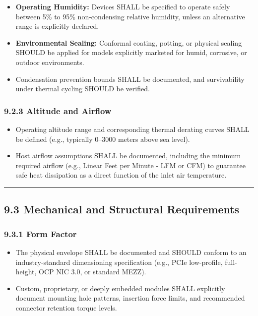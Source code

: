 \documentclass[
]{article}
\begin{document}
\begin{itemize}
\item
  \textbf{Operating Humidity:} Devices SHALL be specified to operate
  safely between 5\% to 95\% non-condensing relative humidity, unless an
  alternative range is explicitly declared.\\
\item
  \textbf{Environmental Sealing:} Conformal coating, potting, or
  physical sealing SHOULD be applied for models explicitly marketed for
  humid, corrosive, or outdoor environments.\\
\item
  Condensation prevention bounds SHALL be documented, and survivability
  under thermal cycling SHOULD be verified.
\end{itemize}

\subsubsection{9.2.3 Altitude and Airflow}\label{altitude-and-airflow}

\begin{itemize}
\item
  Operating altitude range and corresponding thermal derating curves
  SHALL be defined (e.g., typically 0--3000 meters above sea level).\\
\item
  Host airflow assumptions SHALL be documented, including the minimum
  required airflow (e.g., Linear Feet per Minute - LFM or CFM) to
  guarantee safe heat dissipation as a direct function of the inlet air
  temperature.
\end{itemize}

\begin{center}\rule{0.5\linewidth}{0.5pt}\end{center}

\subsection{9.3 Mechanical and Structural
Requirements}\label{mechanical-and-structural-requirements}

\subsubsection{9.3.1 Form Factor}\label{form-factor}

\begin{itemize}
\item
  The physical envelope SHALL be documented and SHOULD conform to an
  industry-standard dimensioning specification (e.g., PCIe low-profile,
  full-height, OCP NIC 3.0, or standard MEZZ).\\
\item
  Custom, proprietary, or deeply embedded modules SHALL explicitly
  document mounting hole patterns, insertion force limits, and
  recommended connector retention torque levels.
\end{itemize}
\end{document}
